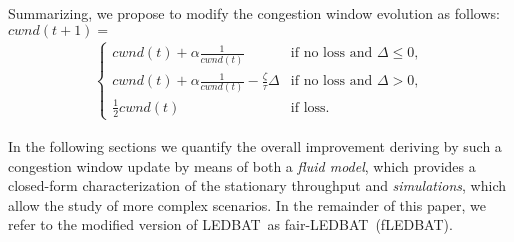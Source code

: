 \documentclass[conference]{IEEEtran}
\newcommand{\btledbat}[0]{LEDBAT}
\newcommand{\fledbat}[0]{fLEDBAT}
\begin{document}
Summarizing, we propose to modify the congestion window evolution as follows:\\

\noindent $cwnd(t+1)=$
\begin{align}\label{eq:new_cwnd_packet}
   \begin{cases}
      cwnd(t)+\alpha  \frac{1}{cwnd(t)} & \text{if no loss and } \Delta \le0,\\
      cwnd(t)+\alpha  \frac{1}{cwnd(t)}- \frac{\zeta}{\tau} \Delta  & \text{if no loss and } \Delta > 0,\\
      \frac{1}{2}cwnd(t) & \text{if loss}.
   \end{cases}
\end{align}

In the following sections we quantify the overall improvement deriving by such a congestion window update by means of both a \emph{fluid model}, which provides a closed-form characterization of the stationary throughput and \emph{simulations}, which allow the study of more complex scenarios.
In the remainder of this paper, we refer to the modified version of \btledbat\ as fair-\btledbat\ (\fledbat).
\end{document}
